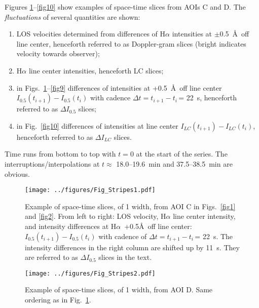 Figures \ref{fig7}--\ref{fig10} show examples of space-time slices from AOIs C and D. The {\em fluctuations} of several quantities are shown: 
\begin{enumerate}
\item
LOS velocities determined from differences of H$\alpha$ intensities at $\pm$0.5~\AA\ off line center, henceforth referred to as Doppler-gram slices (bright indicates velocity towards observer);
\item
H$\alpha$ line center intensities, henceforth LC slices;
\item
in Figs.~\ref{fig7}--\ref{fig9} differences of intensities at +0.5~\AA\ off line center $I_{0.5}(t_{i+1})-I_{0.5}(t_{i})$ with cadence $\Delta t=t_{i+1}-t_{i}$\,= 22~s, henceforth referred to as $\Delta I_{0.5}$ slices;
\item 
in Fig.~\ref{fig10} differences of intensities at line center $I_{LC}(t_{i+1})-I_{LC}(t_{i})$, henceforth referred to as $\Delta I_{LC}$ slices.
\end{enumerate}
Time runs from bottom to top with $t=0$ at the start of the series. The interruptions/interpolations at $t\approx$ 18.0--19.6~min and 37.5--38.5~min are obvious.

\begin{figure}[]
\center 
\texttt{[image: ../figures/Fig\_Stripes1.pdf]} 
\caption{Example of space-time slices, of 1 width, from AOI C in Figs.~\ref{fig1} and \ref{fig2}. From left to right: LOS velocity, H$\alpha$ line center intensity, and intensity differences at H$\alpha$~+0.5\AA\ off line center: $I_{0.5}(t_{i+1})-I_{0.5}(t_{i})$ with cadence of $\Delta t=t_{i+1}-t_{i}$\,= 22~s. The intensity differences in the right column are shifted up by 11~s. They are referred to as $\Delta I_{0.5}$ slices in the text.}  
\label{fig7}
\end{figure}
\begin{figure}[]
\center 
\texttt{[image: ../figures/Fig\_Stripes2.pdf]} 
\caption{Example of space-time slices, of 1 width, from AOI D. Same ordering as in Fig.~\ref{fig7}.}  
\label{fig8}
\end{figure}

